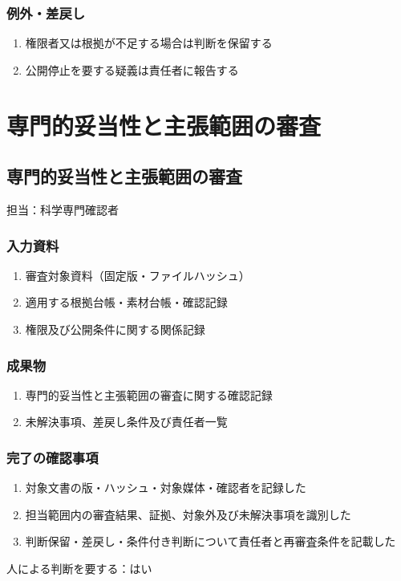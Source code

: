 \documentclass[a4paper,11pt]{article}
\begin{document}
\subsubsection*{例外・差戻し}
\begin{enumerate}[leftmargin=2em,itemsep=0.35em]
\item 権限者又は根拠が不足する場合は判断を保留する
\item 公開停止を要する疑義は責任者に報告する
\end{enumerate}
\section{専門的妥当性と主張範囲の審査}
\subsection{専門的妥当性と主張範囲の審査}
\par 担当：科学専門確認者\par\medskip
\subsubsection*{入力資料}
\begin{enumerate}[leftmargin=2em,itemsep=0.35em]
\item 審査対象資料（固定版・ファイルハッシュ）
\item 適用する根拠台帳・素材台帳・確認記録
\item 権限及び公開条件に関する関係記録
\end{enumerate}
\subsubsection*{成果物}
\begin{enumerate}[leftmargin=2em,itemsep=0.35em]
\item 専門的妥当性と主張範囲の審査に関する確認記録
\item 未解決事項、差戻し条件及び責任者一覧
\end{enumerate}
\subsubsection*{完了の確認事項}
\begin{enumerate}[leftmargin=2em,itemsep=0.35em]
\item 対象文書の版・ハッシュ・対象媒体・確認者を記録した
\item 担当範囲内の審査結果、証拠、対象外及び未解決事項を識別した
\item 判断保留・差戻し・条件付き判断について責任者と再審査条件を記載した
\end{enumerate}
\par 人による判断を要する：はい\par\medskip
\end{document}
